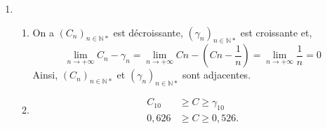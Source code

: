 \documentclass{article}
\begin{document}
\begin{enumerate}
\begin{enumerate}[label=(\alph*)]
\begin{align*}
				&=\frac{1}{n}-\ln\Big(1+\frac{1}{n}\Big)\\
				&=f\Big(\frac{1}{n}\Big).
			\end{align*}
			\item Soit $n\in\mathbb{N}*$. On a $f(x)\geq0, \; \forall_{x\in]-1,\infty[}$ et $\frac{-1}{n+1}\in]-1,\infty[, \; \forall_{n\in\mathbb{N}*}$, donc $f\Big(\frac{-1}{n+1}\Big)\geq0$ et,
			\begin{align*}
				-f\Big(\frac{-1}{n+1}\Big)&\leq0\\
				C_{n+1}-C_n&\leq0\\
				C_{n+1}&\leq C_n.
			\end{align*} 
			Ainsi $(C_n)_{n\in\mathbb{N}*}$ est décroissante.
			De même, $\frac{1}{n}\in]-1,\infty[, \; \forall_{n\in\mathbb{N}*}$ donc $f\Big(\frac{1}{n}\Big)\geq0$ alors $\gamma_{n+1}\geq\gamma_n$ et par suite $(\gamma_n)_{n\in\mathbb{N}*}$ est croissante.
		\end{enumerate}
		\item \begin{enumerate}[label=(\alph*)]
			\item On a $(C_n)_{n\in\mathbb{N}*}$ est décroissante, $(\gamma_n)_{n\in\mathbb{N}*}$ est croissante et,
			$$\lim_{n\to+\infty}C_n-\gamma_n=\lim_{n\to+\infty}Cn-(Cn-\frac{1}{n})=\lim_{n\to+\infty}\frac{1}{n}=0$$
			Ainsi, $(C_n)_{n\in\mathbb{N}*}$ et $(\gamma_n)_{n\in\mathbb{N}*}$ sont adjacentes.
		\item \begin{align*}
			C_{10}&\geq C\geq\gamma_{10}\\
			0,626&\geq C\geq 0,526.
		\end{align*} 
		\end{enumerate}
	\end{enumerate}
\end{document}
